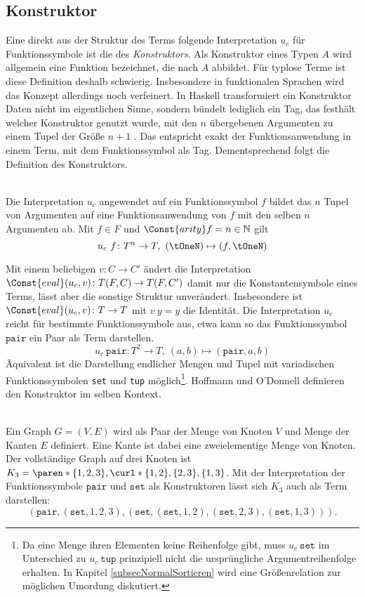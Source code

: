 \subsection{Konstruktor}
Eine direkt aus der Struktur des Terms folgende Interpretation $u_c$ für Funktionssymbole ist die des \emph{Konstruktors}. Als Konstruktor eines Typen $A$ wird allgemein eine Funktion bezeichnet, die nach $A$ abbildet. Für typlose Terme ist diese Definition deshalb schwierig. Insbesondere in funktionalen Sprachen wird das Konzept allerdings noch verfeinert. In Haskell transformiert ein Konstruktor Daten nicht im eigentlichen Sinne, sondern bündelt lediglich ein Tag, das festhält welcher Konstruktor genutzt wurde, mit den $n$ übergebenen Argumenten zu einem Tupel der Größe $n+1$ \cite{haskellConstructor}. Das entspricht exakt der Funktionsanwendung in einem Term, mit dem Funktionssymbol als Tag. Dementsprechend folgt die Definition des Konstruktors.

\begin{definition}~\\
Die Interpretation $u_c$ angewendet auf ein Funktionssymbol $f$ bildet das $n$ Tupel von Argumenten auf eine Funktionsanwendung von $f$ mit den selben $n$ Argumenten ab. 
 Mit $f \in F$ und $\Const{arity} f = n \in \mathbb N$ 
gilt 
$$u_c~f \colon T^n \rightarrow T, ~(\tOneN) \mapsto (f, \tOneN)$$
\end{definition}

Mit einem beliebigen $v \colon C \rightarrow C'$ ändert die Interpretation $\Const{eval}(u_c, v) \colon T(F, C) \rightarrow T(F, C')$ damit nur die Konstantensymbole eines Terms, lässt aber die sonstige Struktur unverändert. Insbesondere ist $\Const{eval}(u_c, v) \colon T \rightarrow T$ mit $v~y = y$ die Identität.
Die Interpretation $u_c$ reicht für bestimmte Funktionssymbole aus, etwa kann so das Funktionssymbol $\texttt{pair}$ ein Paar als Term darstellen.
$$u_c~\texttt{pair} \colon T^2 \rightarrow T, ~(a, b) \mapsto (\texttt{pair}, a, b)$$
Äquivalent ist die Darstellung endlicher Mengen und Tupel mit variadischen Funktionssymbolen \texttt{set} und \texttt{tup} möglich\footnote{Da eine Menge ihren Elementen keine Reihenfolge gibt, muss $u_c~\texttt{set}$ im Unterschied zu $u_c~\texttt{tup}$ prinzipiell nicht die ursprüngliche Argumentreihenfolge erhalten. In Kapitel \ref{subsecNormalSortieren} wird eine Größenrelation zur möglichen Umordung diskutiert.}. 
Hoffmann und O'Donnell \cite{hoffmann1982programming} definieren den Konstruktor im selben Kontext.


\begin{beispiel}~\\
Ein Graph $G = (V, E)$ wird als Paar der Menge von Knoten $V$ und Menge der Kanten $E$ definiert. Eine Kante ist dabei eine zweielementige Menge von Knoten. Der vollständige Graph auf drei Knoten ist $K_3 = \paren*{\{1, 2, 3\}, \curl*{\{1, 2\}, \{2, 3\}, \{1, 3\}}}$. Mit der Interpretation der Funktionssymbole $\texttt{pair}$ und $\texttt{set}$ als Konstruktoren lässt sich $K_3$ auch als Term darstellen:
$$(\texttt{pair}, (\texttt{set}, 1, 2, 3), (\texttt{set}, (\texttt{set}, 1, 2), (\texttt{set}, 2, 3), (\texttt{set}, 1, 3))).$$
\end{beispiel}


